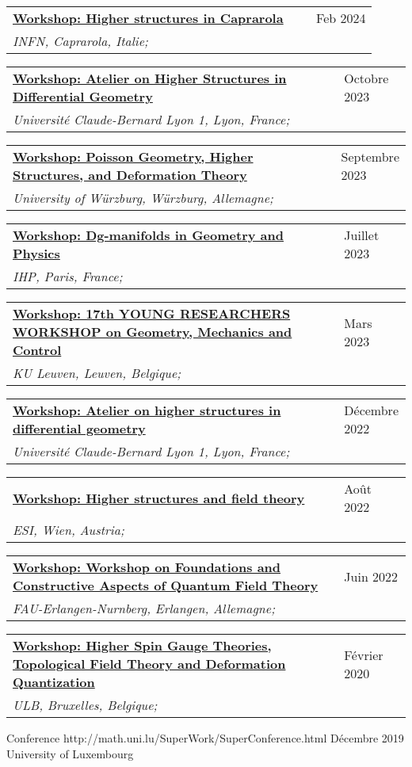 \documentclass[a4paper]{article}
\newcommand{\longvoice}[8]{
    \begin{tabular}{p{0.83\linewidth} p{0.17\linewidth} }
        \textbf{\href{#3}{#2: #1}} & #4 
        \\ 
        \textit{#5, #6, #7;} & {\small\emph{#8}}
    \end{tabular}
    \vspace{.5em}
    }
\begin{document}
    \longvoice{Higher structures in Caprarola}
        {Workshop}
        {http://wpage.unina.it/francesco.dandrea/Caprarola2024/index.html}
        {Feb 2024}
        {INFN}
        {Caprarola}
        {Italie}
        {}
    \longvoice{Atelier on Higher Structures in Differential Geometry}
        {Workshop}
        {https://ryvkin.eu/hs2023/index.html}
        {Octobre 2023}
        {Université Claude-Bernard Lyon 1}
        {Lyon}
        {France}
        {}
    \longvoice{Poisson Geometry, Higher Structures, and Deformation Theory}
        {Workshop}
        {https://www.mathematik.uni-wuerzburg.de/mathematicalphysics/forschung/veranstaltungen/workshops-und-konferenzen/single/news/poisson-geometry-higher-structures-and-deformation-theory/}
        {Septembre 2023}
        {University of Würzburg}
        {Würzburg}
        {Allemagne}
        {}
    \longvoice{Dg-manifolds in Geometry and Physics}
        {Workshop}
        {https://indico.math.cnrs.fr/event/7885/}
        {Juillet 2023}
        {IHP}
        {Paris}
        {France}
        {}
    \longvoice{17th YOUNG RESEARCHERS WORKSHOP on Geometry, Mechanics and Control}
        {Workshop}
        {https://wis.kuleuven.be/events/young-researchers-workshop2023/young-researchers-workshop2023}
        {Mars 2023}
        {KU Leuven}
        {Leuven}
        {Belgique}
        {}
    \longvoice{Atelier on higher structures in differential geometry}
        {Workshop}
        {https://ryvkin.eu/atelier2022/}
        {Décembre 2022}
        {Université Claude-Bernard Lyon 1}
        {Lyon}
        {France}
        {}
    \longvoice{Higher structures and field theory}
        {Workshop}
        {https://www.esi.ac.at/events/e430/}
        {Août 2022}
        {ESI}
        {Wien}
        {Austria}
        {}
    \longvoice{Workshop on Foundations and Constructive Aspects of Quantum Field Theory}
        {Workshop}
        {https://en.www.math.fau.de/mathematical-physics/gandalf-lechner/events10056/workshop-lqp46/}
        {Juin 2022}
        {FAU-Erlangen-Nurnberg}
        {Erlangen}
        {Allemagne}
        {}
    \longvoice{Higher Spin Gauge Theories, Topological Field Theory and Deformation Quantization}
        {Workshop}
        {http://www.solvayinstitutes.be/event/workshop/higher_spin_2020/higher_spin_2020.html}
        {Février 2020}
        {ULB}
        {Bruxelles}
        {Belgique}
        {}
        {Conference}
        {http://math.uni.lu/SuperWork/SuperConference.html}
        {Décembre 2019}
        {University of Luxembourg}
\end{document}
